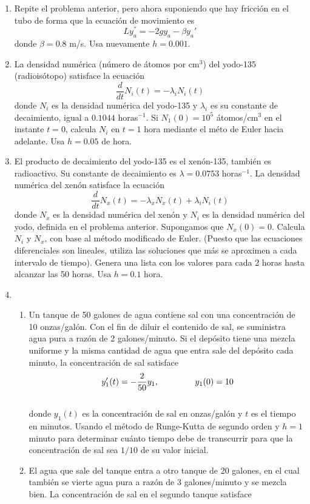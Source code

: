 \documentclass[12pt]{article}
\begin{document}
\begin{enumerate}
\item Repite el problema anterior, pero ahora suponiendo que hay fricci\'{o}n en el tubo de forma que la ecuaci\'{o}n de movimiento es 
\[ Ly_{a}^{''} = -2 gy_{a} - \beta y_{a}{'}\]
donde $\beta=0.8$ m/s. Usa nuevamente $h=0.001$.
\item La densidad num\'{e}rica (n\'{u}mero de \'{a}tomos por cm$^{3}$) del yodo-135 (radiois\'{o}topo) satisface la ecuaci\'{o}n
\[ \frac{d}{dt} N_{i}(t) = - \lambda_{i} N_{i}(t)  \]
 donde $N_{i}$ es la densidad num\'{e}rica del yodo-135 y $\lambda_{i}$ es su constante de decaimiento, igual a $0.1044$ horas$^{-1}$. Si $N_{1}(0) = 10^{5}$ \'{a}tomos/cm$^{3}$ en el instante $t=0$, calcula $N_{i}$ en $t=1$ hora mediante el m\'{e}to de Euler hacia adelante. Usa $h=0.05$ de hora.
 \item El producto de decaimiento del yodo-135 es el xen\'{o}n-135, tambi\'{e}n es radioactivo. Su constante de decaimiento es $\lambda = 0.0753$ horas$^{-1}$. La densidad num\'{e}rica del xen\'{o}n satisface la ecuaci\'{o}n
\[ \frac{d}{dt} N_{x}(t) = - \lambda_{x}N_{x}(t) + \lambda_{i} N_{i}(t) \]
donde $N_{x}$ es la densidad num\'{e}rica del xen\'{o}n y $N_{i}$ es la densidad num\'{e}rica del yodo, definida en el problema anterior. Supongamos que $N_{x}(0) = 0$. Calcula $N_{i}$ y $N_{x}$, con base al m\'{e}todo modificado de Euler. (Puesto que las ecuaciones diferenciales son lineales, utiliza las soluciones que m\'{a}s se aproximen a cada intervalo de tiempo). Genera una lista con los valores para cada 2 horas hasta alcanzar las 50 horas. Usa $h=0.1$ hora.
\item
	\begin{enumerate}
		\item Un tanque de 50 galones de agua contiene sal con una concentraci\'{o}n de 10 onzas/gal\'{o}n. Con el fin de diluir el contenido de sal, se suministra agua pura a raz\'{o}n de 2 galones/minuto. Si el dep\'{o}sito tiene una mezcla uniforme y la misma cantidad de agua que entra sale del dep\'{o}sito cada minuto, la concentraci\'{o}n de sal satisface\\
\[ y'_{1}(t)= -\frac{2}{50}y_{1}, \hspace{1.5cm} y_{1}(0)=10 \]\\
donde $y_{1}(t)$ es la concentraci\'{o}n de sal en onzas/gal\'{o}n y $t$ es el tiempo en minutos. Usando el m\'{e}todo de Runge-Kutta de segundo orden y $h=1$ minuto para determinar cu\'{a}nto tiempo debe de transcurrir para que la concentraci\'{o}n de sal sea $1/10$ de su valor inicial.
		\item El agua que sale del tanque entra a otro tanque de 20 galones, en el cual tambi\'{e}n se vierte agua pura a raz\'{o}n de 3 galones/minuto y se mezcla bien. La concentraci\'{o}n de sal en el segundo tanque satisface

\end{enumerate}
\end{enumerate}
\end{document}
